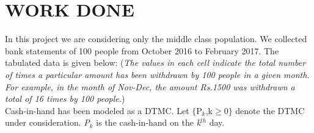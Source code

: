 \documentclass[12pt]{article}
\begin{document}
\section{WORK DONE}
In this project we are considering only the middle class population. We collected bank statements of 100 people from October 2016 to February 2017. The tabulated data is given below:
(\textit{The values in each cell indicate the total number of times a particular amount has been withdrawn by 100 people in a given month. For example, in the month of Nov-Dec, the amount Rs.1500 was withdrawn a total of 16 times by 100 people.}) \\
Cash-in-hand has been modeled as a DTMC.
Let $\lbrace$P$_{k}$,k$\geq$0$\rbrace$ denote the DTMC under consideration. \textit{P$_{k}$} is the cash-in-hand on the \textit{k$^{th}$} day.\\
\end{document}
